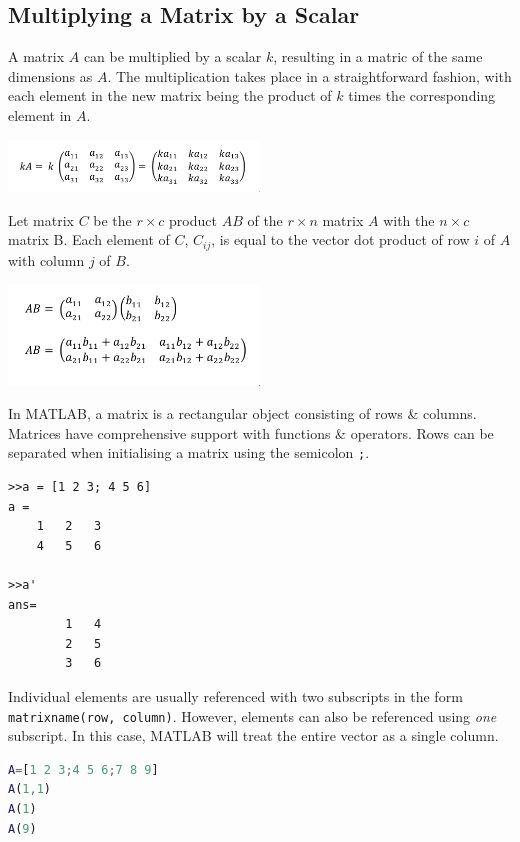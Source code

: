 \documentclass[11pt]{article}
\begin{document}
\subsection{Multiplying a Matrix by a Scalar}
A matrix $A$ can be multiplied by a scalar $k$, resulting in a matric of the same dimensions as $A$. 
The multiplication takes place in a straightforward fashion, with each element in the new matrix being the product of $k$ times the corresponding element in $A$. 

\begin{center}
    \includegraphics[width=0.5\textwidth]{matrixscalar.png}
\end{center}

Let matrix $C$ be the $r \times c$ product $AB$ of the $r \times n$ matrix $A$ with the $n \times c$ matrix B. 
Each element of $C$, $C_{ij}$, is equal to the vector dot product of row $i$ of $A$ with column $j$ of $B$. 

\begin{center}
    \includegraphics[width=0.5\textwidth]{2x2example.png}
\end{center}

In MATLAB, a matrix is a rectangular object consisting of rows \& columns. 
Matrices have comprehensive support with functions \& operators.
Rows can be separated when initialising a matrix using the semicolon \verb|;|. 

\begin{lstlisting}
>>a = [1 2 3; 4 5 6]
a = 
    1   2   3 
    4   5   6

>>a'
ans= 
        1   4 
        2   5 
        3   6
\end{lstlisting}


Individual elements are usually referenced with two subscripts in the form \verb|matrixname(row, column)|. 
However, elements can also be referenced using \textit{one} subscript. 
In this case, MATLAB will treat the entire vector as a single column.

\begin{lstlisting}[language=MATLAB]
A=[1 2 3;4 5 6;7 8 9] 
A(1,1)
A(1)
A(9)
\end{lstlisting}
\end{document}

